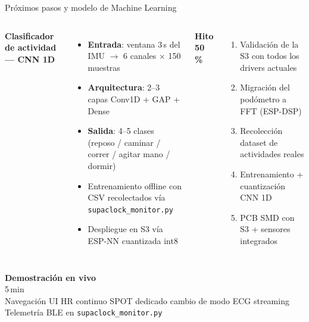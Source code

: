 \documentclass[aspectratio=169, 10pt]{beamer}
\begin{document}
\begin{frame}{Pr\'oximos pasos y modelo de Machine Learning}
    \begin{columns}[T]
        \footnotesize
        \textbf{Clasificador de actividad — CNN 1D}
        \begin{itemize}\itemsep0pt
            \item \textbf{Entrada}: ventana 3\,s del IMU \(\rightarrow\) 6 canales \(\times\) 150 muestras
            \item \textbf{Arquitectura}: 2--3 capas Conv1D + GAP + Dense
            \item \textbf{Salida}: 4--5 clases (reposo / caminar / correr / agitar mano / dormir)
            \item Entrenamiento offline con CSV recolectados v\'ia \texttt{supaclock\_monitor.py}
            \item Despliegue en S3 v\'ia ESP-NN cuantizada int8
        \end{itemize}
        \footnotesize
        \textbf{Hito 50\,\%}
        \begin{enumerate}\itemsep0pt
            \item Validaci\'on de la S3 con todos los drivers actuales
            \item Migraci\'on del pod\'ometro a FFT (ESP-DSP)
            \item Recolecci\'on dataset de actividades reales
            \item Entrenamiento + cuantizaci\'on CNN 1D
            \item PCB SMD con S3 + sensores integrados
        \end{enumerate}
    \end{columns}
\end{frame}

\begin{frame}[plain]
    \centering
    \vspace{1.5cm}
    {\Huge \color{main} \textbf{Demostraci\'on en vivo}}\\[0.6cm]
    {\Large 5\,min}\\[0.4cm]
    \footnotesize
    Navegaci\'on UI \textbar{} HR continuo \textbar{} SPOT dedicado \textbar{} cambio de modo \textbar{} ECG streaming\\
    Telemetr\'ia BLE en \texttt{supaclock\_monitor.py}
\end{frame}
\end{document}
